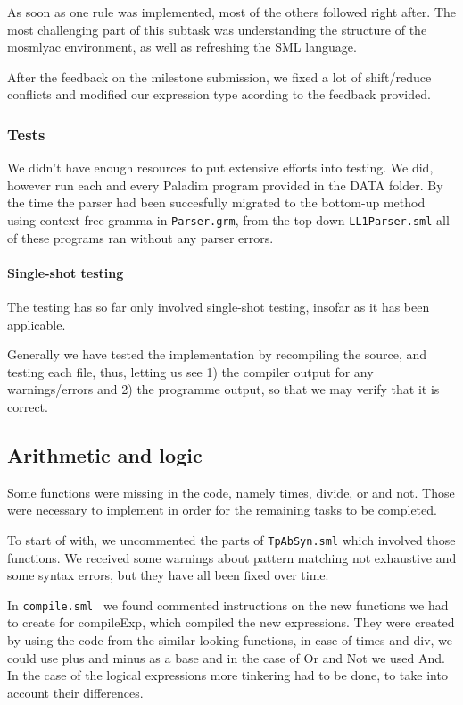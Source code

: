 \documentclass[11pt]{article}
\begin{document}
As soon as one rule was implemented, most of the others followed right after.
The most challenging part of this subtask was understanding the structure of
the mosmlyac environment, as well as refreshing the SML language.

After the feedback on the milestone submission, we fixed a lot of shift/reduce conflicts and modified our expression type acording to the feedback provided.

\subsubsection{Tests}
We didn't have enough resources to put extensive efforts into testing. We did,
however run each and every Paladim program provided in the DATA folder. By the
time the parser had been succesfully migrated to the bottom-up method using
context-free gramma in {\tt Parser.grm}, from the top-down {\tt LL1Parser.sml}
all of these programs ran without any parser errors.

\paragraph{Single-shot testing}
The testing has so far only involved single-shot testing, insofar as it has
been applicable.

Generally we have tested the implementation by recompiling the source, and
testing each file, thus, letting us see 1) the compiler output for any
warnings/errors and 2) the programme output, so that we may verify that it is correct.

\subsection{Arithmetic and logic}
Some functions were missing in the code, namely times, divide, or and not. Those were necessary to implement in order for the remaining tasks to be completed.

To start of with, we uncommented the parts of {\tt TpAbSyn.sml} which involved  those functions. We received some  warnings about pattern matching not exhaustive and some syntax errors, but they have all been fixed over time.

In {\tt compile.sml } we found commented instructions on the new functions we had to create for compileExp, which compiled the new expressions. They were created by using the code from the similar looking functions, in case of times and div, we could use plus and minus as a base and in the case of Or and Not we used And. In the case of the logical expressions more tinkering had to be done, to take into account their differences.
\end{document}
